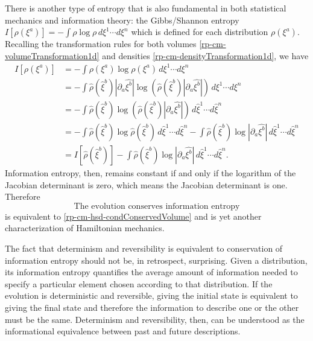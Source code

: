 There is another type of entropy that is also fundamental in both statistical mechanics and information theory: the Gibbs/Shannon entropy $I[\rho(\xi^a)]=-\int \rho \log \rho \, d\xi^1 \cdots d\xi^n$ which is defined for each distribution $\rho(\xi^a)$. Recalling the transformation rules for both volumes \ref{rp-cm-volumeTransformation1d} and densities \ref{rp-cm-densityTransformation1d}, we have
\begin{equation}
	\begin{aligned}
	I[\rho(\xi^a)] &= - \int \rho(\xi^a) \log \rho(\xi^a) \, d\xi^1 \cdots d\xi^n \\
&= - \int  \hat{\rho}(\hat{\xi}^b) \left| \partial_a \hat{\xi^b} \right| \log \left( \hat{\rho}(\hat{\xi}^b) \left| \partial_a \hat{\xi^b} \right| \right) \, d\xi^1 \cdots d\xi^n \\
&= - \int \hat{\rho}(\hat{\xi}^b) \log \left( \hat{\rho}(\hat{\xi}^b) \left| \partial_a \hat{\xi^b} \right| \right) \, d\hat{\xi}^1 \cdots d\hat{\xi}^n \\
&= - \int \hat{\rho}(\hat{\xi}^b) \log \hat{\rho}(\hat{\xi}^b) \, d\hat{\xi}^1 \cdots d\hat{\xi}^n - \int \hat{\rho}(\hat{\xi}^b) \log \left| \partial_a \hat{\xi^b} \right| \, d\hat{\xi}^1 \cdots d\hat{\xi}^n \\
&= I[\hat{\rho}(\hat{\xi}^b)] - \int \hat{\rho}(\hat{\xi}^b) \log \left| \partial_a \hat{\xi^b} \right| \, d\hat{\xi}^1 \cdots d\hat{\xi}^n.
	\end{aligned}
\end{equation}
Information entropy, then, remains constant if and only if the logarithm of the Jacobian determinant is zero, which means the Jacobian determinant is one. Therefore
\begin{equation}\label{rp-cm-hsd-condInformation}
	\tag{HM-11}
	\text{The evolution conserves information entropy}	
\end{equation}
is equivalent to \ref{rp-cm-hsd-condConservedVolume} and is yet another characterization of Hamiltonian mechanics.

The fact that determinism and reversibility is equivalent to conservation of information entropy should not be, in retrospect, surprising. Given a distribution, its information entropy quantifies the average amount of information needed to specify a particular element chosen according to that distribution. If the evolution is deterministic and reversible, giving the initial state is equivalent to giving the final state and therefore the information to describe one or the other must be the same. Determinism and reversibility, then, can be understood as the informational equivalence between past and future descriptions.

